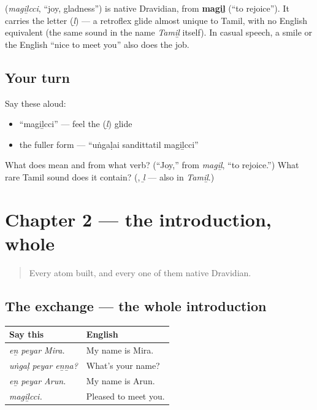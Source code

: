 \begin{cousinweb}
\textbf{} (\emph{magiḻcci}, \textquotedblleft{}joy, gladness\textquotedblright{}) is native Dravidian, from \textbf{magiḻ} (\textquotedblleft{}to rejoice\textquotedblright{}). It carries the letter \textbf{} (\emph{ḻ}) — a retroflex glide almost unique to Tamil, with no English equivalent (the same sound in the name \emph{Tamiḻ} itself). In casual speech, a smile or the English \textquotedblleft{}nice to meet you\textquotedblright{} also does the job.
\end{cousinweb}

\subsection*{Your turn}
Say these aloud:

\begin{itemize}
\raggedright
  \item \textquotedblleft{}magiḻcci\textquotedblright{} — feel the  (\emph{ḻ}) glide
  \item the fuller form — \textquotedblleft{}uṅgaḷai sandittatil magiḻcci\textquotedblright{}
\end{itemize}

\begin{tcolorbox}[breakable,colback=teal!4,colframe=teal!35!black,title={Before you move on}]
What does \textbf{} mean and from what verb? (\textquotedblleft{}Joy,\textquotedblright{} from \emph{magiḻ}, \textquotedblleft{}to rejoice.\textquotedblright{}) What rare Tamil sound does it contain? (\textbf{}, \emph{ḻ} — also in \emph{Tamiḻ}.)
\end{tcolorbox}
\section[Practice]{Chapter 2 — the introduction, whole}

\label{lesson:TA-C02-practice}



\begin{quote}
Every atom built, and every one of them native Dravidian.
\end{quote}

\subsection*{The exchange — the whole introduction}
\noindent
\begin{tabularx}{\linewidth}{@{}>{\raggedright\arraybackslash}X>{\raggedright\arraybackslash}X@{}}
\toprule
\textbf{Say this} & \textbf{English} \\
\midrule
\emph{eṉ peyar Mira.} & My name is Mira. \\
\emph{uṅgaḷ peyar eṉṉa?} & What's your name? \\
\emph{eṉ peyar Arun.} & My name is Arun. \\
\emph{magiḻcci.} & Pleased to meet you. \\
\bottomrule
\end{tabularx}

